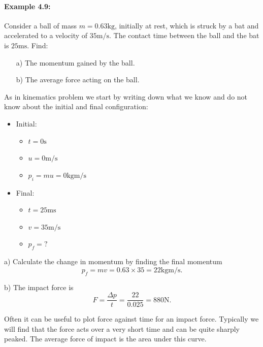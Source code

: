 \documentclass[a4paper,12pt]{book}
\begin{document}
\paragraph{Example 4.9:} Consider a ball of mass $m=0.63\text{kg}$, initially at rest, which is struck by a bat and accelerated to a velocity of $35\text{m/s}$. The  contact time between the ball and the bat is $25\text{ms}$. Find:
\begin{itemize}
\setlength{\itemsep}{-5pt}
    \item[a)] The momentum gained by the ball.
    \item[b)] The average force acting on the ball.
\end{itemize} 
As in kinematics problem we start by writing down what we know and do not know about the initial and final configuration:
\begin{itemize}
\setlength{\itemsep}{-5pt}
    \item Initial:
    \begin{itemize}
\setlength{\itemsep}{-5pt}
    \item $t=0\text{s}$
    \item $u=0\text{m/s}$
    \item $p_{i}=mu=0\text{kgm/s}$
\end{itemize} 
    \item Final:
    \begin{itemize}
\setlength{\itemsep}{-5pt}
    \item $t=25\text{ms}$
    \item $v=35\text{m/s}$
    \item $p_{f}=?$
\end{itemize} 
\end{itemize} 
a) Calculate the change in momentum by finding the final momentum
\begin{equation*}
p_{f}=mv=0.63\times 35 =22\text{kgm/s}.
\end{equation*}

b) The impact force is
\begin{equation*}
F=\frac{\Delta p}{t}=\frac{22}{0.025}=880\text{N}.
\end{equation*}


Often it can be useful to plot force against time for an impact force. Typically we will find that the force acts over a very short time and can be quite sharply peaked. The average force of impact is the area under this curve.\\

\vspace{2cm}
\end{document}
